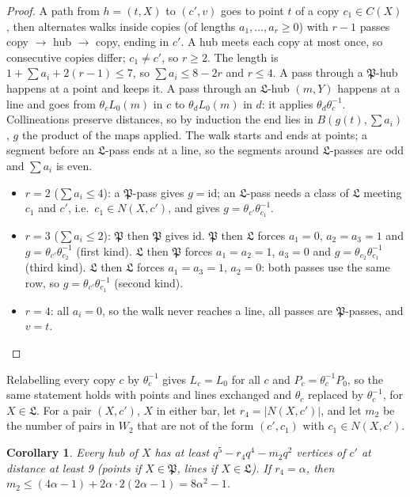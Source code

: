 \documentclass[11pt]{amsart}
\newtheorem{corollary}[theorem]{Corollary}
\theoremstyle{definition}
\theoremstyle{remark}
\numberwithin{equation}{section}
\begin{document}
\begin{proof}
A path from $h=(t,X)$ to $(c',v)$ goes to point $t$ of a copy $c_1\in C(X)$, then alternates walks inside copies (of lengths
$a_1,\dots,a_r\ge0$) with $r-1$ passes copy $\to$ hub $\to$ copy, ending in $c'$. A hub meets each copy at most once, so
consecutive copies differ; $c_1\ne c'$, so $r\ge2$. The length is $1+\sum a_i+2(r-1)\le7$, so $\sum a_i\le8-2r$ and $r\le4$. A
pass through a $\mathfrak P$-hub happens at a point and keeps it. A pass through an $\mathfrak L$-hub $(m,Y)$ happens at a line
and goes from $\theta_cL_0(m)$ in $c$ to $\theta_dL_0(m)$ in $d$: it applies $\theta_d\theta_c^{-1}$. Collineations
preserve distances, so by induction the end lies in $B(g(t),\sum a_i)$, $g$ the product of the maps applied. The walk starts
and ends at points; a segment before an $\mathfrak L$-pass ends at a line, so the segments around $\mathfrak L$-passes are
odd and $\sum a_i$ is even.
\begin{itemize}
\item $r=2$ ($\sum a_i\le4$): a $\mathfrak P$-pass gives $g=\mathrm{id}$; an $\mathfrak L$-pass needs a class of $\mathfrak L$
  meeting $c_1$ and $c'$, i.e.\ $c_1\in N(X,c')$, and gives $g=\theta_{c'}\theta_{c_1}^{-1}$.
\item $r=3$ ($\sum a_i\le2$): $\mathfrak P$ then $\mathfrak P$ gives $\mathrm{id}$. $\mathfrak P$ then $\mathfrak L$ forces
  $a_1=0$, $a_2=a_3=1$ and $g=\theta_{c'}\theta_{c_2}^{-1}$ (first kind). $\mathfrak L$ then $\mathfrak P$ forces $a_1=a_2=1$,
  $a_3=0$ and $g=\theta_{c_2}\theta_{c_1}^{-1}$ (third kind). $\mathfrak L$ then $\mathfrak L$ forces $a_1=a_3=1$, $a_2=0$:
  both passes use the same row, so $g=\theta_{c'}\theta_{c_1}^{-1}$ (second kind).
\item $r=4$: all $a_i=0$, so the walk never reaches a line, all passes are $\mathfrak P$-passes, and $v=t$.
\end{itemize}
\end{proof}

Relabelling every copy $c$ by $\theta_c^{-1}$ gives $L_c=L_0$ for all $c$ and $P_c=\theta_c^{-1}P_0$, so the same statement
holds with points and lines exchanged and $\theta_c$ replaced by $\theta_c^{-1}$, for $X\in\mathfrak L$. For a pair
$(X,c')$, $X$ in either bar, let $r_4=|N(X,c')|$, and let $m_2$ be the number of pairs in $W_2$ that are not of the form
$(c',c_1)$ with $c_1\in N(X,c')$.

\begin{corollary}\label{cor:farcount}
Every hub of $X$ has at least $q^5-r_4q^4-m_2q^2$ vertices of $c'$ at distance at least 9 (points if $X\in\mathfrak P$, lines
if $X\in\mathfrak L$). If $r_4=\alpha$, then $m_2\le(4\alpha-1)+2\alpha\cdot2(2\alpha-1)=8\alpha^2-1$.
\end{corollary}
\end{document}
